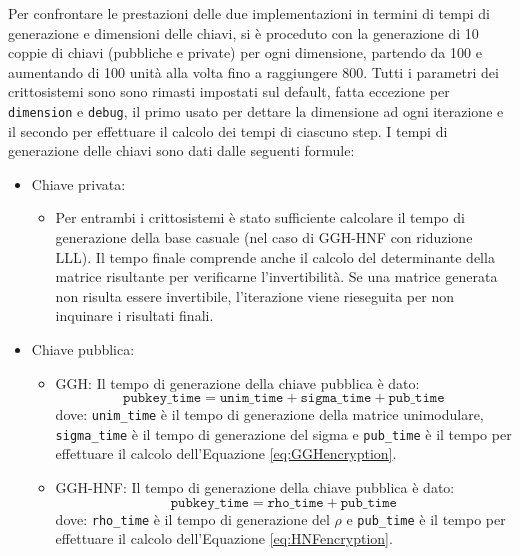 Per confrontare le prestazioni delle due implementazioni in termini di tempi di generazione 
e dimensioni delle chiavi, si è proceduto con la generazione di 10 coppie di chiavi 
(pubbliche e private) per ogni dimensione, partendo da 100 e aumentando di 100 unità alla volta 
fino a raggiungere 800. Tutti i parametri dei crittosistemi sono sono rimasti impostati 
sul default, fatta eccezione per \texttt{dimension} e \texttt{debug}, il primo usato per 
dettare la dimensione ad ogni iterazione e il secondo per effettuare il calcolo dei tempi
di ciascuno step. I tempi di generazione delle chiavi sono dati dalle seguenti formule:
\begin{itemize}
    \item Chiave privata:
    \begin{itemize}
        \item Per entrambi i crittosistemi è stato sufficiente calcolare il tempo di 
        generazione della base casuale (nel caso di GGH-HNF con riduzione LLL). Il tempo
        finale comprende anche il calcolo del determinante della matrice risultante 
        per verificarne l'invertibilità. Se una matrice generata non risulta essere 
        invertibile, l'iterazione viene rieseguita per non inquinare i risultati finali. 
    \end{itemize}
    \item Chiave pubblica:
    \begin{itemize}
        \item GGH: Il tempo di generazione della chiave pubblica è dato:
        $$\texttt{pubkey\_time} = \texttt{unim\_time}+\texttt{sigma\_time}+\texttt{pub\_time}$$
        dove: \texttt{unim\_time} è il tempo di generazione della matrice unimodulare, 
        \texttt{sigma\_time} è il tempo di generazione del sigma e \texttt{pub\_time} è il 
        tempo per effettuare il calcolo dell'Equazione \ref{eq:GGHencryption}.
        \item GGH-HNF: Il tempo di generazione della chiave pubblica è dato:
        $$\texttt{pubkey\_time} = \texttt{rho\_time}+\texttt{pub\_time}$$
        dove: \texttt{rho\_time} è il tempo di generazione del $\rho$ e 
        \texttt{pub\_time} è il tempo per effettuare il calcolo dell'Equazione \ref{eq:HNFencryption}.
    \end{itemize} 
\end{itemize}

